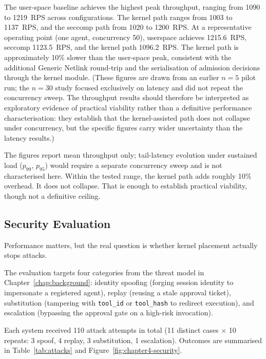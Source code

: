 The user-space baseline achieves the highest peak throughput, ranging from \num{1090} to \num{1219}~RPS across configurations.
The kernel path ranges from \num{1003} to \num{1137}~RPS, and the seccomp path from \num{1020} to \num{1200}~RPS.
At a representative operating point (one agent, concurrency 50), userspace achieves \num{1215.6}~RPS, seccomp \num{1123.5}~RPS, and the kernel path \num{1096.2}~RPS.
The kernel path is approximately 10\% slower than the user-space peak, consistent with the additional Generic Netlink round-trip and the serialisation of admission decisions through the kernel module.
(These figures are drawn from an earlier $n = 5$ pilot run; the $n = 30$ study focused exclusively on latency and did not repeat the concurrency sweep. The throughput results should therefore be interpreted as exploratory evidence of practical viability rather than a definitive performance characterisation: they establish that the kernel-assisted path does not collapse under concurrency, but the specific figures carry wider uncertainty than the latency results.)

The figures report mean throughput only; tail-latency evolution under sustained load ($p_{99}$, $p_{95}$) would require a separate concurrency sweep and is not characterised here.
Within the tested range, the kernel path adds roughly 10\% overhead. It does not collapse. That is enough to establish practical viability, though not a definitive ceiling.


\subsection{Security Evaluation}

Performance matters, but the real question is whether kernel placement actually stops attacks.

The evaluation targets four categories from the threat model in Chapter~\ref{chap:background}: identity spoofing (forging session identity to impersonate a registered agent), replay (reusing a stale approval ticket), substitution (tampering with \texttt{tool\_id} or \texttt{tool\_hash} to redirect execution), and escalation (bypassing the approval gate on a high-risk invocation).

Each system received 110 attack attempts in total (11 distinct cases $\times$ 10 repeats: 3 spoof, 4 replay, 3 substitution, 1 escalation).
Outcomes are summarised in Table~\ref{tab:attacks} and Figure~\ref{fig:chapter4-security}.

